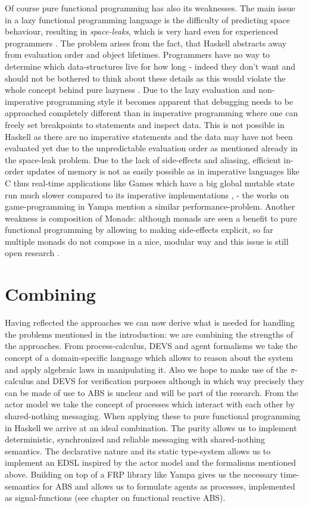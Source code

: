 Of course pure functional programming has also its weaknesses. The main issue in a lazy functional programming language is the difficulty of predicting space behaviour, resulting in \textit{space-leaks}, which is very hard even for experienced programmers \cite{hudak_history_2007}. The problem arises from the fact, that Haskell abstracts away from evaluation order and object lifetimes. Programmers have no way to determine which data-structures live for how long - indeed they don't want and should not be bothered to think about these details as this would violate the whole concept behind pure lazyness \cite{hudak_history_2007}.
Due to the lazy evaluation and non-imperative programming style it becomes apparent that debugging needs to be approached completely different than in imperative programming where one can freely set breakpoints to statements and inspect data. This is not possible in Haskell as there are no imperative statements and the data may have not been evaluated yet due to the unpredictable evaluation order as mentioned already in the space-leak problem.
Due to the lack of side-effects and aliasing, efficient in-order updates of memory is not as easily possible as in imperative languages like C thus real-time applications like Games which have a big global mutable state run much slower compared to its imperative implementations  \cite{mun_hon_functional_2005}, \cite{meisinger_game-engine-architektur_2010} - the works on game-programming in Yampa mention a similar performance-problem.
Another weakness is composition of Monads: although monads are seen a benefit to pure functional programming by allowing to making side-effects explicit, so far multiple monads do not compose in a nice, modular way and this issue is still open research \cite{hudak_history_2007}.

\section{Combining}
Having reflected the approaches we can now derive what is needed for handling the problems mentioned in the introduction: we are combining the strengths of the approaches. From process-calculus, DEVS and agent formalisms we take the concept of a domain-specific language which allows to reason about the system and apply algebraic laws in manipulating it. Also we hope to make use of the $\pi$-calculus and DEVS for verification purposes although in which way precisely they can be made of use to ABS is unclear and will be part of the research. From the actor model we take the concept of processes which interact with each other by shared-nothing messaging.
When applying these to pure functional programming in Haskell we arrive at an ideal combination. The purity allows us to implement deterministic, synchronized and reliable messaging with shared-nothing semantics. The declarative nature and its static type-system allows us to implement an EDSL inspired by the actor model and the formalisms mentioned above. Building on top of a FRP library like Yampa gives us the necessary time-semantics for ABS and allows us to formulate agents as processes, implemented as signal-functions (see chapter on functional reactive ABS).

